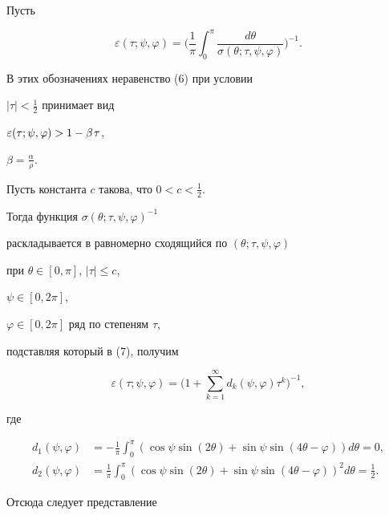 Пусть


\begin{equation}


\varepsilon (\tau ;\psi,\varphi)=\bigg({\frac{1}{\pi}\int_0^\pi


{\frac{{d\theta}}{{\sigma(\theta


;\tau, \psi,\varphi)}}}} \bigg)^{- 1}.


\end{equation}


В этих обозначениях неравенство (6) при условии


$| \tau | < \frac{1}{2}$ принимает вид


$\varepsilon (\tau ;\psi,\varphi) > 1 - \beta {\kern 1pt} \tau$,


$\beta=\frac{\alpha}{\rho}$.


Пусть константа $c$ такова, что $0 < c <\frac{1}{2}$.


Тогда функция ${\sigma (\theta ;\tau, \psi,\varphi)}^{-1}$


раскладывается в равномерно сходящийся по $(\theta ;\tau, \psi,\varphi)$


при $\theta \in [0, \pi]$, $| \tau | \le c$,


$\psi \in [0, 2\pi]$,


$\varphi \in [0, 2\pi]$ ряд по степеням $\tau$,


подставляя который в (7), получим


$$


\varepsilon (\tau ;\psi,\varphi)=\bigg(


1+\sum_{k=1}^\infty {d_k (\psi,\varphi) \tau ^k} \bigg)^{-1},


$$


где


\begin{align*}


d_1 (\psi,\varphi)&=-


\frac{1}{\pi}\int_0^\pi (\cos \psi \sin (2\theta)+\sin \psi


\sin (4\theta - \varphi)){d\theta}=0,\\


d_2 (\psi,\varphi)&=\frac{1}{\pi}\int_0^\pi


(\cos \psi \sin (2\theta)+\sin \psi \sin (4\theta - \varphi))^{2}


{d\theta}=\frac{1}{2}.


\end{align*}


Отсюда следует представление



